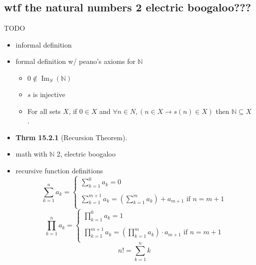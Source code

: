 \documentclass[11pt]{article}
\theoremstyle{definition}
\newcommand{\bb}[1]{\mathbb{#1}}
\DeclareMathOperator{\Img}{Im}
\begin{document}
\subsection*{wtf the natural numbers 2 electric boogaloo???}
TODO
\begin{itemize}
    \item informal definition
    \item formal definition w/ peano's axioms for $\bb{N}$
    \begin{itemize}
        \item $0 \not\in \Img_S(\bb{N})$
        \item $s$ is injective
        \item For all sets $X$, if $0\in X$ and $\forall n\in N, (n\in X\rightarrow s(n)\in X)$ then $\bb{N}\subseteq X$.
    \end{itemize}
    \item \textbf{Thrm 15.2.1} (Recursion Theorem).
    \item math with $\bb{N}$ 2, electric boogaloo
    \item recursive function definitions
    \[ 
        \sum\limits_{k=1}^{n}a_k = \left\{
            \begin{array}{ll}
                \sum\limits_{k=1}^{0}a_k = 0\\
                \\
                \sum\limits_{k=1}^{m+1}a_k = (\sum\limits_{k=1}^{m}a_k) + a_{m + 1} \text{  if } n=m+1\\
            \end{array} 
        \right.
    \]
    \[ 
        \prod\limits_{k=1}^{n}a_k= \left\{
            \begin{array}{ll}
                \prod\limits_{k=1}^{0}a_k = 1\\
                \\
                \prod\limits_{k=1}^{m+1}a_k = (\prod\limits_{k=1}^{m}a_k) \cdot a_{m + 1} \text{  if } n=m+1\\
            \end{array} 
        \right. 
    \]
    \[ n! = \sum\limits_{k=1}^{n}k \]
\end{itemize}
\end{document}
